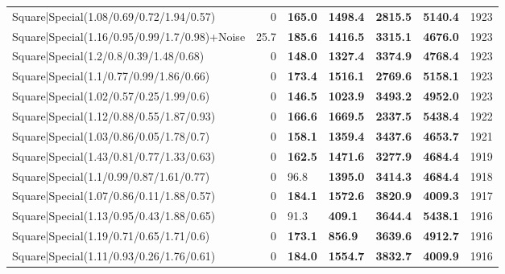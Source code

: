 \begin{tabular}{lrllllr}
 Square|Special(1.08/0.69/0.72/1.94/0.57)                      &             0   & \textbf{165.0} & \textbf{1498.4} & \textbf{2815.5} & \textbf{5140.4} &         1923 \\
 Square|Special(1.16/0.95/0.99/1.7/0.98)+Noise                 &            25.7 & \textbf{185.6} & \textbf{1416.5} & \textbf{3315.1} & \textbf{4676.0} &         1923 \\
 Square|Special(1.2/0.8/0.39/1.48/0.68)                        &             0   & \textbf{148.0} & \textbf{1327.4} & \textbf{3374.9} & \textbf{4768.4} &         1923 \\
 Square|Special(1.1/0.77/0.99/1.86/0.66)                       &             0   & \textbf{173.4} & \textbf{1516.1} & \textbf{2769.6} & \textbf{5158.1} &         1923 \\
 Square|Special(1.02/0.57/0.25/1.99/0.6)                       &             0   & \textbf{146.5} & \textbf{1023.9} & \textbf{3493.2} & \textbf{4952.0} &         1923 \\
 Square|Special(1.12/0.88/0.55/1.87/0.93)                      &             0   & \textbf{166.6} & \textbf{1669.5} & \textbf{2337.5} & \textbf{5438.4} &         1922 \\
 Square|Special(1.03/0.86/0.05/1.78/0.7)                       &             0   & \textbf{158.1} & \textbf{1359.4} & \textbf{3437.6} & \textbf{4653.7} &         1921 \\
 Square|Special(1.43/0.81/0.77/1.33/0.63)                      &             0   & \textbf{162.5} & \textbf{1471.6} & \textbf{3277.9} & \textbf{4684.4} &         1919 \\
 Square|Special(1.1/0.99/0.87/1.61/0.77)                       &             0   & 96.8           & \textbf{1395.0} & \textbf{3414.3} & \textbf{4684.4} &         1918 \\
 Square|Special(1.07/0.86/0.11/1.88/0.57)                      &             0   & \textbf{184.1} & \textbf{1572.6} & \textbf{3820.9} & \textbf{4009.3} &         1917 \\
 Square|Special(1.13/0.95/0.43/1.88/0.65)                      &             0   & 91.3           & \textbf{409.1}  & \textbf{3644.4} & \textbf{5438.1} &         1916 \\
 Square|Special(1.19/0.71/0.65/1.71/0.6)                       &             0   & \textbf{173.1} & \textbf{856.9}  & \textbf{3639.6} & \textbf{4912.7} &         1916 \\
 Square|Special(1.11/0.93/0.26/1.76/0.61)                      &             0   & \textbf{184.0} & \textbf{1554.7} & \textbf{3832.7} & \textbf{4009.9} &         1916 \\

\end{tabular}

